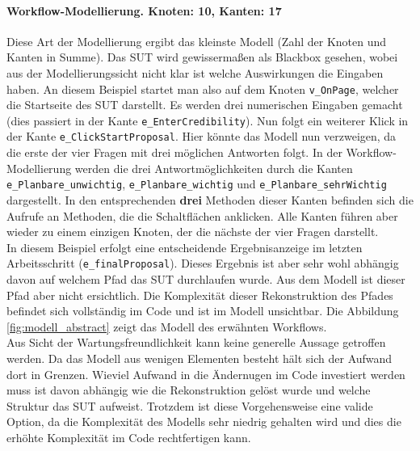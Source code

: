 \paragraph{Workflow-Modellierung. Knoten: 10, Kanten: 17}
Diese Art der Modellierung ergibt das kleinste Modell (Zahl der Knoten und Kanten in Summe). Das \Gls{SUT} wird gewissermaßen als Blackbox gesehen, wobei aus der Modellierungssicht nicht klar ist welche Auswirkungen die Eingaben haben. An diesem Beispiel startet man also auf dem Knoten \texttt{v\_OnPage}, welcher die Startseite des \Gls{SUT} darstellt. Es werden drei numerischen Eingaben gemacht (dies passiert in der Kante \texttt{e\_EnterCredibility}). Nun folgt ein weiterer Klick in der Kante \linebreak \texttt{e\_ClickStartProposal}. Hier könnte das Modell nun verzweigen, da die erste der vier Fragen mit drei möglichen Antworten folgt. In der Workflow-Modellierung werden die drei Antwortmöglichkeiten durch die Kanten \texttt{e\_Planbare\_unwichtig}, \texttt{e\_Planbare\_wichtig} und \texttt{e\_Planbare\_sehrWichtig} dargestellt. In den entsprechenden \textbf{drei} Methoden dieser Kanten befinden sich die Aufrufe an Methoden, die die Schaltflächen anklicken. Alle Kanten führen aber wieder zu einem einzigen Knoten, der die nächste der vier Fragen darstellt.\\
In diesem Beispiel erfolgt eine entscheidende Ergebnisanzeige im letzten Arbeitsschritt \linebreak (\texttt{e\_finalProposal}). Dieses Ergebnis ist aber sehr wohl abhängig davon auf welchem Pfad das \Gls{SUT} durchlaufen wurde. Aus dem Modell ist dieser Pfad aber nicht ersichtlich. Die Komplexität dieser Rekonstruktion des Pfades befindet sich vollständig im Code und ist im Modell unsichtbar. Die Abbildung \ref{fig:modell_abstract} zeigt das Modell des erwähnten Workflows.\\
Aus Sicht der Wartungsfreundlichkeit kann keine generelle Aussage getroffen werden. Da das Modell aus wenigen Elementen besteht hält sich der Aufwand dort in Grenzen. Wieviel Aufwand in die Ändernugen im Code investiert werden muss ist davon abhängig wie die Rekonstruktion gelöst wurde und welche Struktur das \Gls{SUT} aufweist. Trotzdem ist diese Vorgehensweise eine valide Option, da die Komplexität des Modells sehr niedrig gehalten wird und dies die erhöhte Komplexität im Code rechtfertigen kann.

